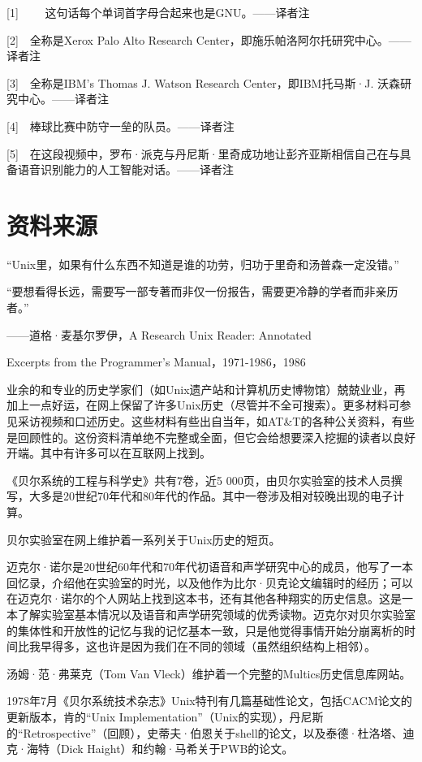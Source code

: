 \documentclass[a4paper,12pt,UTF8,twoside]{ctexbook}
\begin{document}
[1]　 　这句话每个单词首字母合起来也是GNU。——译者注

[2]　全称是Xerox Palo Alto Research Center，即施乐帕洛阿尔托研究中心。——译者注

[3]　全称是IBM’s Thomas J. Watson Research Center，即IBM托马斯·J. 沃森研究中心。——译者注

[4]　棒球比赛中防守一垒的队员。——译者注

[5]　在这段视频中，罗布·派克与丹尼斯·里奇成功地让彭齐亚斯相信自己在与具备语音识别能力的人工智能对话。——译者注


\backmatter

\chapter{资料来源}

“Unix里，如果有什么东西不知道是谁的功劳，归功于里奇和汤普森一定没错。”

“要想看得长远，需要写一部专著而非仅一份报告，需要更冷静的学者而非亲历者。”

——道格·麦基尔罗伊，A Research Unix Reader: Annotated

Excerpts from the Programmer’s Manual，1971-1986，1986

业余的和专业的历史学家们（如Unix遗产站和计算机历史博物馆）兢兢业业，再加上一点好运，在网上保留了许多Unix历史（尽管并不全可搜索）。更多材料可参见采访视频和口述历史。这些材料有些出自当年，如AT\&T的各种公关资料，有些是回顾性的。这份资料清单绝不完整或全面，但它会给想要深入挖掘的读者以良好开端。其中有许多可以在互联网上找到。

《贝尔系统的工程与科学史》共有7卷，近5 000页，由贝尔实验室的技术人员撰写，大多是20世纪70年代和80年代的作品。其中一卷涉及相对较晚出现的电子计算。

贝尔实验室在网上维护着一系列关于Unix历史的短页。

迈克尔·诺尔是20世纪60年代和70年代初语音和声学研究中心的成员，他写了一本回忆录，介绍他在实验室的时光，以及他作为比尔·贝克论文编辑时的经历；可以在迈克尔·诺尔的个人网站上找到这本书，还有其他各种翔实的历史信息。这是一本了解实验室基本情况以及语音和声学研究领域的优秀读物。迈克尔对贝尔实验室的集体性和开放性的记忆与我的记忆基本一致，只是他觉得事情开始分崩离析的时间比我早得多，这也许是因为我们在不同的领域（虽然组织结构上相邻）。

汤姆·范·弗莱克（Tom Van Vleck）维护着一个完整的Multics历史信息库网站。

1978年7月《贝尔系统技术杂志》Unix特刊有几篇基础性论文，包括CACM论文的更新版本，肯的“Unix Implementation”（Unix的实现），丹尼斯的“Retrospective”（回顾），史蒂夫·伯恩关于shell的论文，以及泰德·杜洛塔、迪克·海特（Dick Haight）和约翰·马希关于PWB的论文。
\end{document}
